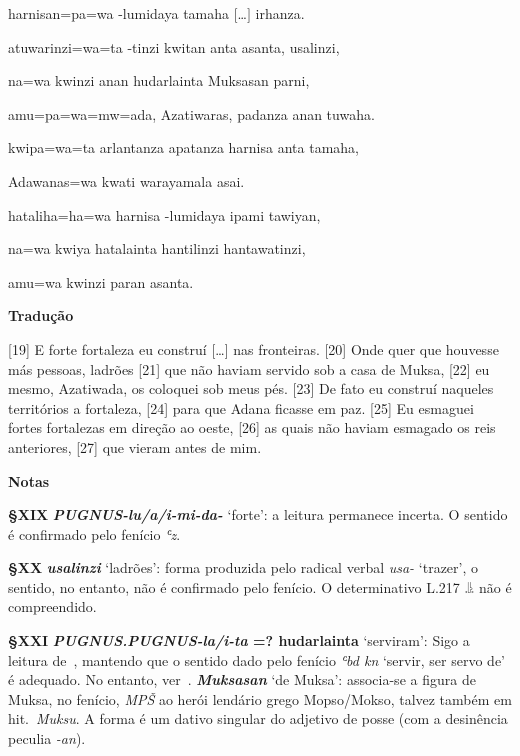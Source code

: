 \setcounter{parcount}{18}
\begin{parnumbersr}

	\raggedright%
	\itshape%

	harnisan=pa=wa -lumidaya tamaha $[$\ldots{}$]$ irhanza.

	atuwarinzi=wa=ta -tinzi kwitan anta asanta, usalinzi,

	na=wa kwinzi anan hudarlainta Muksasan parni,

	amu=pa=wa=mw=ada, Azatiwaras, padanza anan tuwaha.

	kwipa=wa=ta arlantanza apatanza harnisa anta tamaha,

	Adawanas=wa kwati warayamala asai.

	hataliha=ha=wa  harnisa -lumidaya ipami tawiyan,

	na=wa kwiya hatalainta hantilinzi hantawatinzi,

	amu=wa kwinzi paran asanta.

\end{parnumbersr}

\bigskip%
\noindent\textbf{Tradução}

[19] E forte fortaleza eu construí [\ldots] nas fronteiras. [20] Onde quer que
houvesse más pessoas, ladrões [21] que não haviam servido sob a
casa de Muksa, [22] eu mesmo, Azatiwada, os coloquei sob meus pés. [23] De
fato eu construí naqueles territórios a fortaleza, [24] para que Adana ficasse
em paz. [25] Eu esmaguei fortes fortalezas em direção ao oeste, [26] as quais
não haviam esmagado os reis anteriores, [27] que vieram antes de mim.

\bigskip
\noindent\textbf{Notas}

\smallskip
\noindent\textbf{§XIX}\tabto{3em}
\textbf{\emph{\emph{PUGNUS}-lu/a/i-mi-da-}} `forte': a leitura permanece
incerta. O sentido é confirmado pelo fenício \emph{ʿz}.

\smallskip
\noindent\textbf{§XX}\tabto{3em}
\textbf{\emph{usalinzi}} `ladrões': forma produzida pelo radical verbal
\emph{usa-} `trazer', o sentido, no entanto, não é confirmado pelo fenício.
O determinativo L.217 𔓺 não é compreendido.

\smallskip
\noindent\textbf{§XXI}\tabto{3em}
\textbf{\emph{\emph{PUGNUS.PUGNUS}-la/i-ta} {=?} hudarlainta} `serviram':
Sigo a leitura de~\citet{RiekenYakubovich2010}, mantendo que o sentido
dado pelo fenício \emph{ʿbd kn} `servir, ser servo de' é adequado.
No entanto, ver~\citet{MelchertPugnus}.
\textbf{\emph{Muksasan}} `de Muksa': associa-se a figura de Muksa, no fenício,
\emph{MPŠ} ao herói lendário grego Mopso/Mokso, talvez também em hit.\
\emph{Muksu}. A forma é um dativo singular do adjetivo de posse (com a
desinência peculia \emph{-an}).

